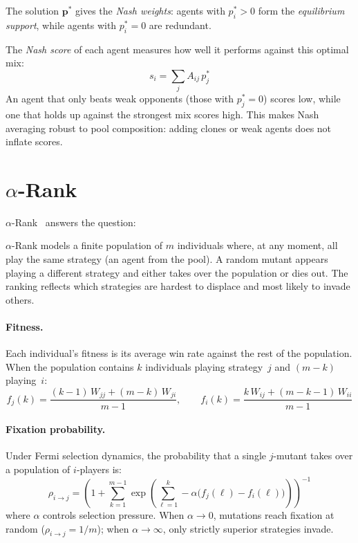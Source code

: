 The solution $\mathbf{p}^*$ gives the \emph{Nash weights}: agents with $p_i^* > 0$ form the \emph{equilibrium support}, while agents with $p_i^* = 0$ are redundant.

The \emph{Nash score} of each agent measures how well it performs against this optimal mix:
\begin{equation}
    s_i = \sum_{j} A_{ij} \, p_j^*
\end{equation}
An agent that only beats weak opponents (those with $p_j^* = 0$) scores low, while one that holds up against the strongest mix scores high. This makes Nash averaging robust to pool composition: adding clones or weak agents does not inflate scores.

\section{$\alpha$-Rank}
\label{app:alpharank-impl}

$\alpha$-Rank~\cite{omidshafieiARankMultiAgentEvaluation2019} answers the question: 

\medskip

$\alpha$-Rank models a finite population of $m$ individuals where, at any moment, all play the same strategy (an agent from the pool). A random mutant appears playing a different strategy and either takes over the population or dies out. The ranking reflects which strategies are hardest to displace and most likely to invade others.

\paragraph*{Fitness.} Each individual's fitness is its average win rate against the rest of the population. When the population contains $k$ individuals playing strategy~$j$ and $(m - k)$ playing~$i$:
\begin{equation}
    f_j(k) = \frac{(k-1)\,W_{jj} + (m-k)\,W_{ji}}{m-1},
    \qquad
    f_i(k) = \frac{k\,W_{ij} + (m-k-1)\,W_{ii}}{m-1}
\end{equation}

\paragraph*{Fixation probability.} Under Fermi selection dynamics, the probability that a single $j$-mutant takes over a population of $i$-players is:
\begin{equation}
    \rho_{i \to j} = \left( 1 + \sum_{k=1}^{m-1} \exp\!\left( \sum_{\ell=1}^{k} -\alpha \bigl( f_j(\ell) - f_i(\ell) \bigr) \right) \right)^{-1}
\end{equation}
where $\alpha$ controls selection pressure. When $\alpha \to 0$, mutations reach fixation at random ($\rho_{i \to j} = 1/m$); when $\alpha \to \infty$, only strictly superior strategies invade.

